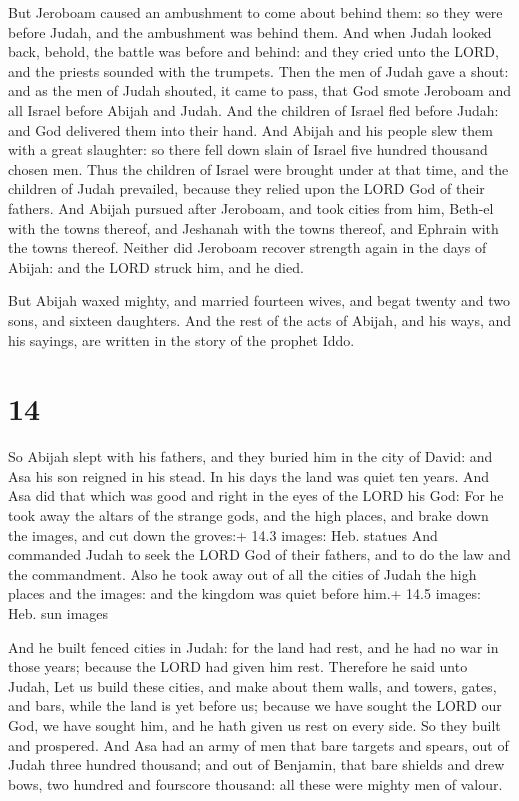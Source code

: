  But Jeroboam caused an ambushment to come about behind
them: so they were before Judah, and the ambushment was behind them.
 And when Judah looked back, behold, the battle was before
and behind: and they cried unto the LORD, and the priests sounded with
the trumpets.  Then the men of Judah gave a shout: and as
the men of Judah shouted, it came to pass, that God smote Jeroboam and
all Israel before Abijah and Judah.  And the children of
Israel fled before Judah: and God delivered them into their hand.
 And Abijah and his people slew them with a great
slaughter: so there fell down slain of Israel five hundred thousand
chosen men.  Thus the children of Israel were brought under
at that time, and the children of Judah prevailed, because they relied
upon the LORD God of their fathers.  And Abijah pursued
after Jeroboam, and took cities from him, Beth-el with the towns
thereof, and Jeshanah with the towns thereof, and Ephrain with the towns
thereof.  Neither did Jeroboam recover strength again in
the days of Abijah: and the LORD struck him, and he died.

 But Abijah waxed mighty, and married fourteen wives, and
begat twenty and two sons, and sixteen daughters.  And the
rest of the acts of Abijah, and his ways, and his sayings, are written
in the story of the prophet Iddo.

\hypertarget{section-13}{%
\section{14}\label{section-13}}

 So Abijah slept with his fathers, and they buried him in
the city of David: and Asa his son reigned in his stead. In his days the
land was quiet ten years.  And Asa did that which was good
and right in the eyes of the LORD his God:  For he took away
the altars of the strange gods, and the high places, and brake down the
images, and cut down the groves:+ 14.3 images: Heb. statues 
And commanded Judah to seek the LORD God of their fathers, and to do the
law and the commandment.  Also he took away out of all the
cities of Judah the high places and the images: and the kingdom was
quiet before him.+ 14.5 images: Heb. sun images

 And he built fenced cities in Judah: for the land had
rest, and he had no war in those years; because the LORD had given him
rest.  Therefore he said unto Judah, Let us build these
cities, and make about them walls, and towers, gates, and bars, while
the land is yet before us; because we have sought the LORD our God, we
have sought him, and he hath given us rest on every side. So they built
and prospered.  And Asa had an army of men that bare targets
and spears, out of Judah three hundred thousand; and out of Benjamin,
that bare shields and drew bows, two hundred and fourscore thousand: all
these were mighty men of valour.

